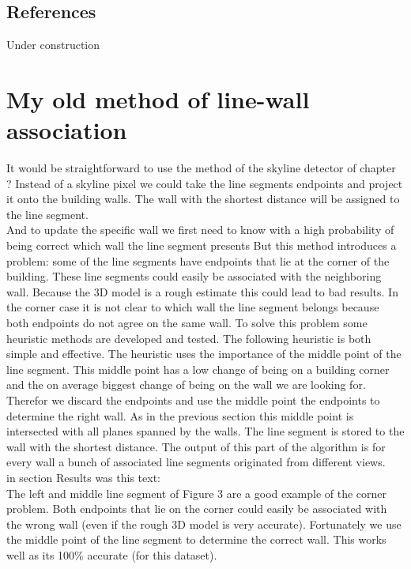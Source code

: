 \documentclass[10pt]{article}
\begin{document}
\subsection{References}
Under construction


\section{My old method of line-wall association}
It would be straightforward to use the method of the skyline detector of
chapter ?%
Instead of a skyline pixel we could take the line segments
endpoints and project it onto the building walls. The wall with the shortest
distance will be assigned to the line segment.\\

And to update the specific wall we first need to know with a high probability of being correct which wall the line segment presents
But this method introduces a problem: some of the line segments have endpoints that lie at the corner of the building. These line segments could easily be associated with the neighboring wall. Because the 3D model is a rough estimate this could lead to bad results.
In the corner case it is not clear to which wall the line segment belongs because both endpoints do not agree on the same wall. To solve this problem some heuristic methods are developed and tested. The following heuristic is both simple and effective.
The heuristic uses the importance of the middle point of the line segment. This middle point has a low change of being on a building corner and the on average biggest change of being on the wall we are looking for.
Therefor we discard the endpoints and use the middle point the endpoints to determine the right wall.
As in the previous section %
this middle point is intersected with all planes spanned by the walls. The line segment is stored to the wall with the shortest distance.
The output of this part of the algorithm is for every wall a bunch of associated line segments originated from different views.\\

in section Results was this text:\\
The left and middle line segment of Figure 3 %
are
a good example of the corner problem. Both endpoints that lie on the corner could easily be associated
with the wrong wall (even if the rough 3D model is very accurate). Fortunately
we use the middle point of the line segment to determine the correct wall. This
works well as its 100\% accurate (for this dataset).
\end{document}
